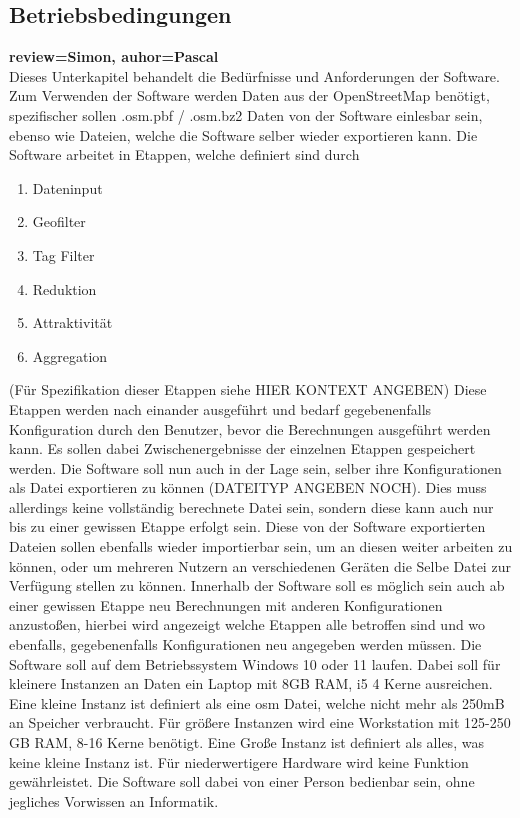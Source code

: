 \documentclass[parskip=full]{scrartcl} %
\begin{document}
\subsection{Betriebsbedingungen}
\textbf{review=Simon, auhor=Pascal\\}
Dieses Unterkapitel behandelt die Bedürfnisse und Anforderungen der Software.
Zum Verwenden der Software werden Daten aus der OpenStreetMap benötigt, spezifischer sollen .osm.pbf / .osm.bz2 Daten von der Software einlesbar sein, ebenso wie Dateien, welche die Software selber wieder exportieren kann.
\newpage
Die Software arbeitet in Etappen, welche definiert sind durch
\begin{enumerate}
    \item Dateninput
    \item Geofilter
    \item Tag Filter
    \item Reduktion
    \item Attraktivität
    \item Aggregation
\end{enumerate}

(Für Spezifikation dieser Etappen siehe HIER KONTEXT ANGEBEN)
\newline
Diese Etappen werden nach einander ausgeführt und bedarf gegebenenfalls Konfiguration durch den Benutzer, bevor die Berechnungen ausgeführt werden kann.
Es sollen dabei Zwischenergebnisse der einzelnen Etappen gespeichert werden.
Die Software soll nun auch in der Lage sein, selber ihre Konfigurationen als Datei exportieren zu können (DATEITYP ANGEBEN NOCH). Dies muss allerdings keine vollständig berechnete Datei sein, sondern diese kann auch nur bis zu einer gewissen Etappe erfolgt sein.
Diese von der Software exportierten Dateien sollen ebenfalls wieder importierbar sein, um an diesen weiter arbeiten zu können, oder um mehreren Nutzern an verschiedenen Geräten die Selbe Datei zur Verfügung stellen zu können.
Innerhalb der Software soll es möglich sein auch ab einer gewissen Etappe neu Berechnungen mit anderen Konfigurationen anzustoßen, hierbei wird angezeigt welche Etappen alle betroffen sind und wo ebenfalls, gegebenenfalls Konfigurationen neu angegeben werden müssen.
Die Software soll auf dem Betriebssystem Windows 10 oder 11 laufen.
Dabei soll für kleinere Instanzen an Daten ein Laptop mit 8GB RAM, i5 4 Kerne ausreichen.
Eine kleine Instanz ist definiert als eine osm Datei, welche nicht mehr als 250mB an Speicher verbraucht.
Für größere Instanzen wird eine Workstation mit 125-250 GB RAM, 8-16 Kerne benötigt.
Eine Große Instanz ist definiert als alles, was keine kleine Instanz ist.
Für niederwertigere Hardware wird keine Funktion gewährleistet.
Die Software soll dabei von einer Person bedienbar sein, ohne jegliches Vorwissen an Informatik.
\end{document}
